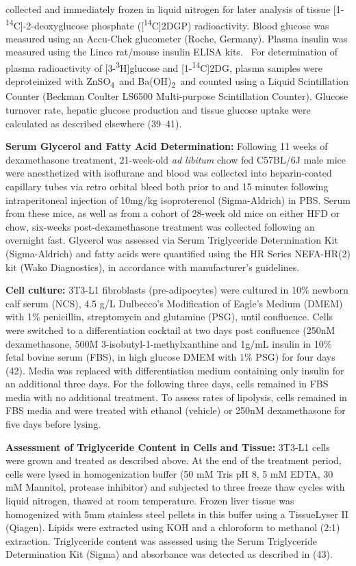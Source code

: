 \documentclass[11pt]{article} %
\begin{document}
collected and immediately frozen in liquid nitrogen for later analysis
of tissue {[}1-\textsuperscript{14}C{]}-2-deoxyglucose phosphate
({[}\textsuperscript{14}C{]}2DGP) radioactivity. Blood glucose was
measured using an Accu-Chek glucometer (Roche, Germany). Plasma insulin
was measured using the Linco rat/mouse insulin ELISA kits.~ For
determination of plasma radioactivity of
{[}3-\textsuperscript{3}H{]}glucose and
{[}1-\textsuperscript{14}C{]}2DG, plasma samples were deproteinized with
ZnSO\textsubscript{4}~and Ba(OH)\textsubscript{2}~and counted using a
Liquid Scintillation Counter (Beckman Coulter LS6500 Multi-purpose
Scintillation Counter). Glucose turnover rate, hepatic glucose
production and tissue glucose uptake were calculated as described
elsewhere (39--41).

\textbf{Serum Glycerol and Fatty Acid Determination:} Following 11 weeks
of dexamethasone treatment, 21-week-old \emph{ad libitum} chow fed
C57BL/6J male mice were anesthetized with isoflurane and blood was
collected into heparin-coated capillary tubes via retro orbital bleed
both prior to and 15 minutes following intraperitoneal injection of
10mg/kg isoproterenol (Sigma-Aldrich) in PBS. Serum from these mice, as
well as from a cohort of 28-week old mice on either HFD or chow,
six-weeks post-dexamethasone treatment was collected following an
overnight fast. Glycerol was assessed via Serum Triglyceride
Determination Kit (Sigma-Aldrich) and fatty acids were quantified using
the HR Series NEFA-HR(2) kit (Wako Diagnostics), in accordance with
manufacturer's guidelines.

\textbf{Cell culture:} 3T3-L1 fibroblasts (pre-adipocytes) were cultured
in 10\% newborn calf serum (NCS), 4.5 g/L Dulbecco's Modification of
Eagle's Medium (DMEM) with 1\% penicillin, streptomycin and glutamine
(PSG), until confluence. Cells were switched to a differentiation
cocktail at two days post confluence (250nM dexamethasone, 500M
3-isobutyl-1-methylxanthine and 1g/mL insulin in 10\% fetal bovine
serum (FBS), in high glucose DMEM with 1\% PSG) for four days (42).
Media was replaced with differentiation medium containing only insulin
for an additional three days. For the following three days, cells
remained in FBS media with no additional treatment. To assess rates of
lipolysis, cells remained in FBS media and were treated with ethanol
(vehicle) or 250nM dexamethasone for five days before lysing.

\textbf{Assessment of Triglyceride Content in Cells and Tissue:} 3T3-L1
cells were grown and treated as described above. At the end of the
treatment period, cells were lysed in homogenization buffer (50 mM Tris
pH 8, 5 mM EDTA, 30 mM Mannitol, protease inhibitor) and subjected to
three freeze thaw cycles with liquid nitrogen, thawed at room
temperature. Frozen liver tissue was homogenized with 5mm stainless
steel pellets in this buffer using a TissueLyser II (Qiagen). Lipids
were extracted using KOH and a chloroform to methanol (2:1) extraction.
Triglyceride content was assessed using the Serum Triglyceride
Determination Kit (Sigma) and absorbance was detected as described in
(43).
\end{document}
